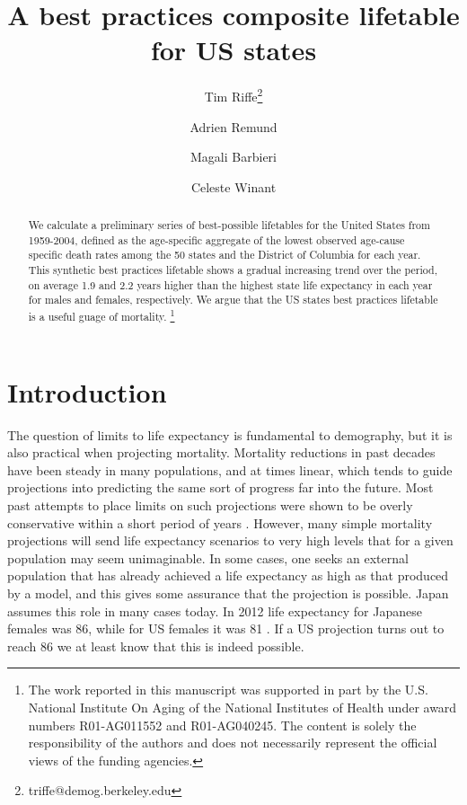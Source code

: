 \documentclass[11pt,oneside,a4paper]{article} %
\newcommand\ackn[1]{%
  \begingroup
  \renewcommand\thefootnote{}\footnote{#1}%
  \addtocounter{footnote}{-1}%
  \endgroup
}
\begin{document}
\title{A best practices composite lifetable for US states}

\author[1]{Tim Riffe\thanks{triffe@demog.berkeley.edu}}
\author[2,3]{Adrien Remund}
\author[3,4]{Magali Barbieri}
\author[4]{Celeste Winant}


\maketitle

\begin{abstract}
We calculate a preliminary series of best-possible lifetables for the United
States from 1959-2004, defined as the age-specific aggregate of the lowest
observed age-cause specific death rates among the 50
states and the District of Columbia for each year. This synthetic best practices lifetable shows a gradual
increasing trend over the period, on average 1.9 and 2.2 years higher
than the highest state life expectancy in each year for males and females,
respectively. We argue that the US states best practices lifetable is a useful
guage of mortality.
\ackn{The work reported in this manuscript was supported in part by the U.S.
National Institute On Aging of the National Institutes of Health under award
numbers R01-AG011552 and R01-AG040245. The content is solely the responsibility of the authors and does not necessarily represent the official views of the funding agencies.}
\end{abstract}


\section*{Introduction}

The question of limits to life expectancy is fundamental to demography, but it
is also practical when projecting mortality. Mortality reductions in past
decades have been steady in many populations, and at times linear, which tends
to guide projections into predicting the same sort of progress far into the
future. Most past attempts to place limits on such projections were shown to be
overly conservative within a short period of years \citep{oeppen2002broken}.
However, many simple mortality projections will send life expectancy scenarios
to very high levels that for a given population may seem unimaginable. In some
cases, one seeks an external population that has already achieved a life
expectancy as high as that produced by a model, and this gives some assurance
that the projection is possible. Japan assumes this role in many cases today. In
2012 life expectancy for Japanese females was 86, while for US females it was 81
\citep{HMD}. If a US projection turns out to reach 86 we at least know that this
is indeed possible.
\end{document}
